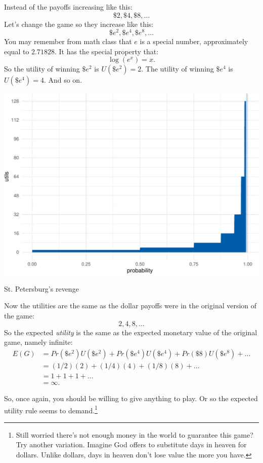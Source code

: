 \documentclass[justified]{tufte-book}
\renewcommand{\u}{U}
\newcommand{\p}{Pr}
\newcommand{\E}{E}
\theoremstyle{definition}
\theoremstyle{definition}
\theoremstyle{definition}
\theoremstyle{remark}
\begin{document}
Instead of the payoffs increasing like this: \[ \$2, \$4, \$8, \ldots \]
Let's change the game so they increase like this:
\[ \$e^2, \$e^4, \$e^8, \ldots \] You may remember from math class that
\(e\) is a special number, approximately equal to \(2.71828\). It has
the special property that: \[ \log(e^x) = x. \] So the utility of
winning \(\$e^2\) is \(\u(\$e^2) = 2\). The utility of winning \(\$e^4\)
is \(\u(\$e^4) = 4\). And so on.

\begin{marginfigure}
\includegraphics{_main_files/figure-latex/expstp-1} \caption[St]{St. Petersburg's revenge}\label{fig:expstp}
\end{marginfigure}

Now the utilities are the same as the dollar payoffs were in the
original version of the game: \[ 2, 4, 8, \ldots \] So the expected
\emph{utility} is the same as the expected monetary value of the
original game, namely infinite: \[
  \begin{aligned}
     \E(G) &= \p(\$e^2) \u(\$e^2) + \p(\$e^4) \u(\$e^4) + \p(\$8) \u(\$e^8) + \ldots\\
          &= (1/2)(2) + (1/4)(4) + (1/8)(8) + \ldots\\
          &= 1 + 1 + 1 + \ldots\\
          &= \infty.
  \end{aligned}
\]

So, once again, you should be willing to give anything to play. Or so
the expected utility rule seems to demand.\footnote{Still worried
  there's not enough money in the world to guarantee this game? Try
  another variation. Imagine God offers to substitute days in heaven for
  dollars. Unlike dollars, days in heaven don't lose value the more you
  have.}
\end{document}

